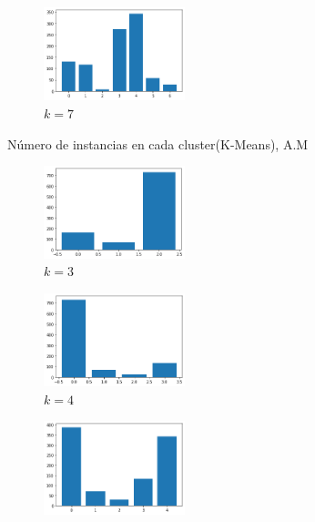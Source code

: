 \begin{figure}[H]
\begin{subfigure}{.5\textwidth}
  \centering
  \includegraphics[width=0.45\textwidth]{imagenes/counter/am/km7.png}
  \caption{$k=7$}
\end{subfigure}
\caption{Número de instancias en cada cluster(K-Means), A.M}
\label{fig:hm-km}
\end{figure}


\begin{figure}[H]
\begin{subfigure}{.5\textwidth}
  \centering
  \includegraphics[width=0.45\textwidth]{imagenes/counter/am/agg3.png}
  \caption{$k=3$}
\end{subfigure}%
\begin{subfigure}{.5\textwidth}
  \centering
  \includegraphics[width=0.45\textwidth]{imagenes/counter/am/agg4.png}
  \caption{$k=4$}
\end{subfigure}
\begin{subfigure}{.5\textwidth}
  \centering
  \includegraphics[width=0.45\textwidth]{imagenes/counter/am/agg5.png}

\end{subfigure}
\end{figure}
